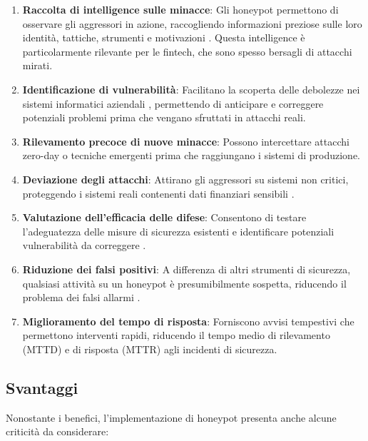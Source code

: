 \documentclass[a4paper,12pt]{report}
\begin{document}
\begin{enumerate}
    \item \textbf{Raccolta di intelligence sulle minacce}: Gli honeypot permettono di osservare gli aggressori in azione, raccogliendo informazioni preziose sulle loro identità, tattiche, strumenti e motivazioni \cite{proofpoint2024, fortinet2023}. Questa intelligence è particolarmente rilevante per le fintech, che sono spesso bersagli di attacchi mirati.
    \item \textbf{Identificazione di vulnerabilità}: Facilitano la scoperta delle debolezze nei sistemi informatici aziendali \cite{universeit2021}, permettendo di anticipare e correggere potenziali problemi prima che vengano sfruttati in attacchi reali.
    \item \textbf{Rilevamento precoce di nuove minacce}: Possono intercettare attacchi zero-day o tecniche emergenti prima che raggiungano i sistemi di produzione.
    \item \textbf{Deviazione degli attacchi}: Attirano gli aggressori su sistemi non critici, proteggendo i sistemi reali contenenti dati finanziari sensibili \cite{vito2024}.
    \item \textbf{Valutazione dell'efficacia delle difese}: Consentono di testare l'adeguatezza delle misure di sicurezza esistenti e identificare potenziali vulnerabilità da correggere \cite{vito2024}.
    \item \textbf{Riduzione dei falsi positivi}: A differenza di altri strumenti di sicurezza, qualsiasi attività su un honeypot è presumibilmente sospetta, riducendo il problema dei falsi allarmi \cite{nordvpn}.
    \item \textbf{Miglioramento del tempo di risposta}: Forniscono avvisi tempestivi che permettono interventi rapidi, riducendo il tempo medio di rilevamento (MTTD) e di risposta (MTTR) agli incidenti di sicurezza.
\end{enumerate}

\subsection{Svantaggi}
\label{subsec:svantaggi}

Nonostante i benefici, l'implementazione di honeypot presenta anche alcune criticità da considerare:
\end{document}
